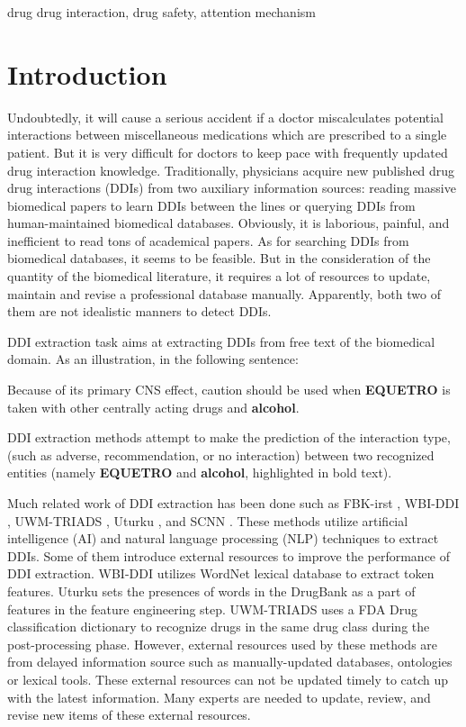 \documentclass[conference]{IEEEtran}
\begin{document}
\begin{IEEEkeywords}
drug drug interaction, drug safety, attention mechanism
\end{IEEEkeywords}

\section{Introduction}
Undoubtedly, it will cause a serious accident if a doctor miscalculates 
potential interactions
between miscellaneous medications which are prescribed to a single patient.
But it is very difficult for doctors to keep pace with frequently updated 
drug interaction knowledge.
Traditionally, physicians acquire new published drug drug interactions (DDIs) 
from two auxiliary information sources:
reading massive biomedical papers to learn DDIs between the lines
or querying DDIs from human-maintained biomedical databases.
Obviously, it is laborious, painful,
and inefficient to read tons of academical papers.
As for searching DDIs from biomedical databases, it seems to be feasible.
But in the consideration of the quantity of the biomedical literature,
it requires a lot of resources to update, maintain and revise a professional database manually.
Apparently, both two of them are not idealistic manners to detect DDIs.

DDI extraction task aims at extracting DDIs from free text of the biomedical domain.
As an illustration, in the following sentence:

\begin{framed}
Because of its primary CNS effect, caution should be used when \textbf{EQUETRO}
is taken with other centrally acting drugs and \textbf{alcohol}.
\end{framed}

\noindent DDI extraction methods attempt to make the prediction of the interaction type,
(such as adverse, recommendation, or no interaction) between
two recognized entities (namely \textbf{EQUETRO} and \textbf{alcohol}, highlighted in bold text).

Much related work of DDI extraction has been done such as FBK-irst 
\cite{chowdhury_fbk-irst:_2013}, WBI-DDI \cite{thomas_wbi-ddi:_2013},
UWM-TRIADS \cite{rastegar-mojarad_uwm-triads:_2013},
Uturku \cite{bjorne_uturku:_2013}, 
and SCNN \cite{zhao_drug_2016}.
These methods utilize artificial intelligence (AI) and natural language processing (NLP) techniques to extract
DDIs.
Some of them introduce external resources to improve the performance of DDI extraction.
WBI-DDI utilizes WordNet lexical database to extract token features.
Uturku sets the presences of words in the DrugBank as a part of features in the 
feature engineering step.
UWM-TRIADS uses a FDA Drug classification dictionary to recognize drugs in the same
drug class during the post-processing phase.
However, external resources used by these methods are from delayed information source such 
as manually-updated databases, ontologies or lexical tools.
These external resources can not be updated timely to catch up with the latest
information.
Many experts are needed to update, review, and revise new items of these external resources.
\end{document}
